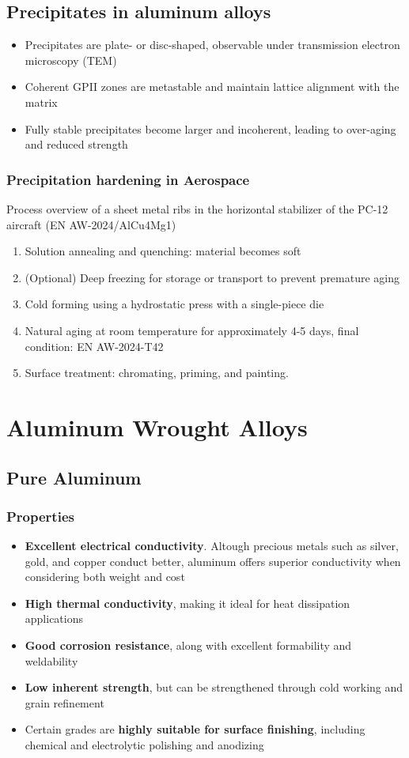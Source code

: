 \documentclass{article}
\begin{document}
\subsection{Precipitates in aluminum alloys}
\begin{itemize}
  \item Precipitates are plate- or disc-shaped, observable under transmission electron microscopy (TEM)
  \item Coherent GPII zones are metastable and maintain lattice alignment with the matrix
  \item Fully stable precipitates become larger and incoherent, leading to over-aging and reduced strength
\end{itemize}

\subsubsection{Precipitation hardening in Aerospace}
Process overview of a sheet metal ribs in the horizontal stabilizer of the PC-12 aircraft (EN AW-2024/AlCu4Mg1)
\begin{enumerate}
  \item Solution annealing and quenching: material becomes soft
  \item (Optional) Deep freezing for storage or transport to prevent premature aging
  \item Cold forming using a hydrostatic press with a single-piece die
  \item Natural aging at room temperature for approximately 4-5 days, final condition: EN AW-2024-T42
  \item Surface treatment: chromating, priming, and painting.
\end{enumerate}

\newpage
\section{Aluminum Wrought Alloys}
\subsection{Pure Aluminum}
\subsubsection{Properties}
\begin{itemize}
  \item \textbf{Excellent electrical conductivity}. Altough precious metals such as silver, gold, and copper conduct better, aluminum offers superior conductivity when considering both weight and cost
  \item \textbf{High thermal conductivity}, making it ideal for heat dissipation applications
  \item \textbf{Good corrosion resistance}, along with excellent formability and weldability
  \item \textbf{Low inherent strength}, but can be strengthened through cold working and grain refinement
  \item Certain grades are \textbf{highly suitable for surface finishing}, including chemical and electrolytic polishing and anodizing
\end{itemize}
\end{document}
